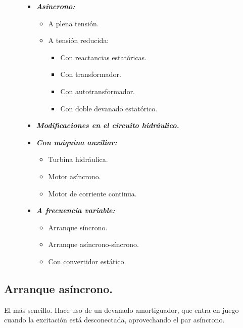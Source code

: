 		\begin{figure}[H]
			\begin{minipage}{0.5\textwidth}
				\begin{itemize}
					\item \textbf{\textit{Asíncrono:}}
					\begin{itemize}
						\item A plena tensión.
						\item A tensión reducida:
						\begin{itemize}
							\item Con reactancias estatóricas.
							\item Con transformador.
							\item Con autotransformador.
							\item Con doble devanado estatórico.
						\end{itemize}
					\end{itemize}
					\item \textit{\textbf{Modificaciones en el circuito hidráulico.}}
				\end{itemize}
			\end{minipage}
			\begin{minipage}{0.5\textwidth}
				\begin{itemize}
					\item \textbf{\textit{Con máquina auxiliar:}}
					\begin{itemize}
						\item Turbina hidráulica.
						\item Motor asíncrono.
						\item Motor de corriente continua.
					\end{itemize}
					
					\item \textbf{\textit{A frecuencia variable:}}
					\begin{itemize}
						\item Arranque síncrono.
						\item Arranque asíncrono-síncrono.
						\item Con convertidor estático.
					\end{itemize}
				\end{itemize}
			\end{minipage}
		\end{figure}
		
		\subsection{Arranque asíncrono.}
			El más sencillo. Hace uso de un devanado amortiguador, que entra en juego cuando la excitación está desconectada, aprovechando el par asíncrono.
			
